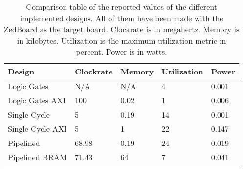 \begin{table}
    \centering
    \begin{tabular}{lllll}
        \hline
        Design           & Clockrate & Memory & Utilization & Power \\
        \hline
        Logic Gates      & N/A & N/A  & 4 & 0.001 \\
        Logic Gates AXI  & 100 & 0.02 & 1 & 0.006 \\
        Single Cycle     & 5   & 0.19 & 14 & 0.001 \\
        Single Cycle AXI & 5   & 1    & 22 & 0.147 \\
        Pipelined        & 68.98 & 0.19 & 24 & 0.019 \\
        Pipelined BRAM   & 71.43 & 64   & 7  & 0.041 \\
        \hline
    \end{tabular}
    \caption{Comparison table of the reported values of the different
        implemented designs. All of them have been made with the ZedBoard as
        the target board. Clockrate is in megahertz. Memory is in kilobytes.
        Utilization is the maximum utilization metric in percent. Power is in
        watts.}
    \label{tab:impl-comp}
\end{table}
